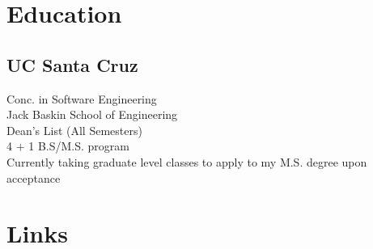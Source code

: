 \documentclass[letterpaper]{deedy-resume} %
\begin{document}




\begin{minipage}[t]{0.33\textwidth} %


\section{Education} 

\subsection{UC Santa Cruz }



Conc. in Software Engineering \\
Jack Baskin School of Engineering \\
Dean's List (All Semesters) \\
\sectionspace
{}
4 $+$ 1 B.S/M.S. program\\
Currently taking graduate level classes to apply to my M.S. degree upon acceptance 

\sectionspace %


\sectionspace %

\iffalse
\section{Links} 


\end{minipage}
\end{document}
